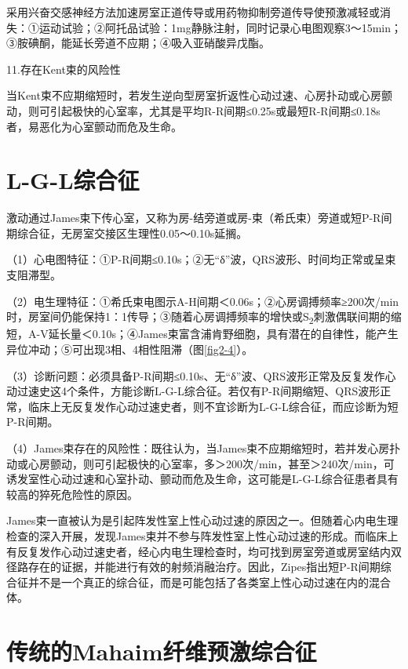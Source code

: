 采用兴奋交感神经方法加速房室正道传导或用药物抑制旁道传导使预激减轻或消失：①运动试验；②阿托品试验：1mg静脉注射，同时记录心电图观察3～15min；③胺碘酮，能延长旁道不应期；④吸入亚硝酸异戊酯。

11.存在Kent束的风险性

当Kent束不应期缩短时，若发生逆向型房室折返性心动过速、心房扑动或心房颤动，则可引起极快的心室率，尤其是平均R-R间期≤0.25s或最短R-R间期≤0.18s者，易恶化为心室颤动而危及生命。

\protect\hypertarget{text00036.htmlux5cux23subid419}{}{}

\section{L-G-L综合征}

激动通过James束下传心室，又称为房-结旁道或房-束（希氏束）旁道或短P-R间期综合征，无房室交接区生理性0.05～0.10s延搁。

（1）心电图特征：①P-R间期≤0.10s；②无“δ”波，QRS波形、时间均正常或呈束支阻滞型。

（2）电生理特征：①希氏束电图示A-H间期＜0.06s；②心房调搏频率≥200次/min时，房室间仍能保持1：1传导；③随着心房调搏频率的增快或S\textsubscript{2}刺激偶联间期的缩短，A-V延长量＜0.10s；④James束富含浦肯野细胞，具有潜在的自律性，能产生异位冲动；⑤可出现3相、4相性阻滞（图\ref{fig2-4}）。

（3）诊断问题：必须具备P-R间期≤0.10s、无“δ”波、QRS波形正常及反复发作心动过速史这4个条件，方能诊断L-G-L综合征。若仅有P-R间期缩短、QRS波形正常，临床上无反复发作心动过速史者，则不宜诊断为L-G-L综合征，而应诊断为短P-R间期。

（4）James束存在的风险性：既往认为，当James束不应期缩短时，若并发心房扑动或心房颤动，则可引起极快的心室率，多＞200次/min，甚至＞240次/min，可诱发室性心动过速和心室扑动、颤动而危及生命，这可能是L-G-L综合征患者具有较高的猝死危险性的原因。

James束一直被认为是引起阵发性室上性心动过速的原因之一。但随着心内电生理检查的深入开展，发现James束并不参与阵发性室上性心动过速的形成。而临床上有反复发作心动过速史者，经心内电生理检查时，均可找到房室旁道或房室结内双径路存在的证据，并能进行有效的射频消融治疗。因此，Zipes指出短P-R间期综合征并不是一个真正的综合征，而是可能包括了各类室上性心动过速在内的混合体。

\protect\hypertarget{text00036.htmlux5cux23subid420}{}{}

\section{传统的Mahaim纤维预激综合征}


